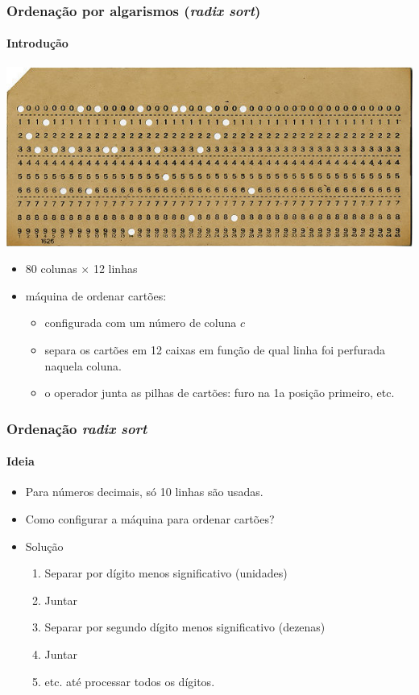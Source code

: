 \documentclass{beamer}
\begin{document}
\begin{frame}

\frametitle{Ordenação por algarismos (\textit{radix sort\/})}
\framesubtitle{Introdução}

\begin{center}
\includegraphics[width=.8\textwidth]{img/punched-card.jpg}

\end{center}

\begin{itemize}
\item 80 colunas $\times$ 12 linhas
\item máquina de ordenar cartões: 
\begin{itemize}
  \item configurada com um número de coluna $c$
  \item separa os cartões em 12 caixas em função de qual linha foi perfurada naquela coluna.
  \item o operador junta as pilhas de cartões: furo na 1a posição primeiro, etc.
\end{itemize}
\end{itemize}
\end{frame}

\begin{frame}
  \frametitle{Ordenação \textit{radix sort\/}}
  \framesubtitle{Ideia}
  \begin{itemize}
    \item Para números decimais, só 10 linhas são usadas.
    \item Como configurar a máquina para ordenar cartões?
      \pause
    \item Solução
      \begin{enumerate}
      \item Separar por dígito menos significativo (unidades)
      \item Juntar
      \item Separar por segundo dígito menos significativo (dezenas)
      \item Juntar
      \item etc. até processar todos os dígitos.
      \end{enumerate}
  \end{itemize}
\end{frame}
\end{document}
